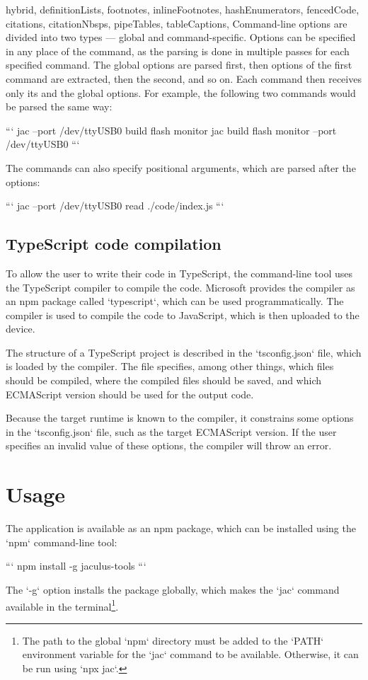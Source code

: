 \begin{markdown*}{%
  hybrid,
  definitionLists,
  footnotes,
  inlineFootnotes,
  hashEnumerators,
  fencedCode,
  citations,
  citationNbsps,
  pipeTables,
  tableCaptions,
}
Command-line options are divided into two types --- global and command-specific. Options can be specified in any place of the command, as the parsing is done in multiple passes for each specified command. The global options are parsed first, then options of the first command are extracted, then the second, and so on. Each command then receives only its and the global options. For example, the following two commands would be parsed the same way:

```
jac --port /dev/ttyUSB0 build flash monitor
jac build flash monitor --port /dev/ttyUSB0
```

The commands can also specify positional arguments, which are parsed after the options:

```
jac --port /dev/ttyUSB0 read ./code/index.js
```

\subsection{TypeScript code compilation}

To allow the user to write their code in TypeScript, the command-line tool uses the TypeScript compiler to compile the code. Microsoft provides the compiler as an npm package called `typescript`, which can be used programmatically. The compiler is used to compile the code to JavaScript, which is then uploaded to the device.

The structure of a TypeScript project is described in the `tsconfig.json` file, which is loaded by the compiler. The file specifies, among other things, which files should be compiled, where the compiled files should be saved, and which ECMAScript version should be used for the output code.

Because the target runtime is known to the compiler, it constrains some options in the `tsconfig.json` file, such as the target ECMAScript version. If the user specifies an invalid value of these options, the compiler will throw an error.


\section{Usage}

The application is available as an npm package, which can be installed using the `npm` command-line tool:

```
npm install -g jaculus-tools
```

The `-g` option installs the package globally, which makes the `jac` command available in the terminal\footnote{The path to the global `npm` directory must be added to the `PATH` environment variable for the `jac` command to be available. Otherwise, it can be run using `npx jac`.}.


\end{markdown*}
